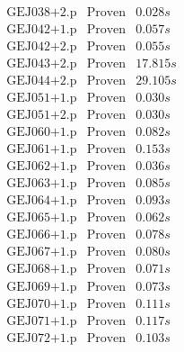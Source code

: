 \documentclass[a4paper,11pt]{report}
\theoremstyle{definition}
\theoremstyle{definition}
\theoremstyle{definition}
\theoremstyle{definition}
\theoremstyle{definition}
\theoremstyle{definition}
\theoremstyle{definition}
\begin{document}
\begin{minipage}{0.45\textwidth}
\[\begin{matrix}
			\text{GEJ038+2.p}&\text{Proven}& 0.028 s\\
			\text{GEJ042+1.p}&\text{Proven}& 0.057 s\\
			\text{GEJ042+2.p}&\text{Proven}& 0.055 s\\
			\text{GEJ043+2.p}&\text{Proven}& 17.815 s\\
			\text{GEJ044+2.p}&\text{Proven}& 29.105 s\\
			\text{GEJ051+1.p}&\text{Proven}& 0.030 s\\
			\text{GEJ051+2.p}&\text{Proven}& 0.030 s\\
			\text{GEJ060+1.p}&\text{Proven}& 0.082 s\\
			\text{GEJ061+1.p}&\text{Proven}& 0.153 s\\
			\text{GEJ062+1.p}&\text{Proven}& 0.036 s\\
			\text{GEJ063+1.p}&\text{Proven}& 0.085 s\\
			\text{GEJ064+1.p}&\text{Proven}& 0.093 s\\
			\text{GEJ065+1.p}&\text{Proven}& 0.062 s\\
			\text{GEJ066+1.p}&\text{Proven}& 0.078 s\\
			\text{GEJ067+1.p}&\text{Proven}& 0.080 s\\
			\text{GEJ068+1.p}&\text{Proven}& 0.071 s\\
			\text{GEJ069+1.p}&\text{Proven}& 0.073 s\\
			\text{GEJ070+1.p}&\text{Proven}& 0.111 s\\
			\text{GEJ071+1.p}&\text{Proven}& 0.117 s\\
			\text{GEJ072+1.p}&\text{Proven}& 0.103 s\\
		\end{matrix}\]
	\end{minipage}
\end{document}
